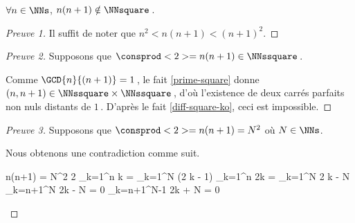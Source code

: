 \begin{fact} \label{case-2}
	 $\forall n \in \NNs$, $n(n+1) \notin \NNsquare$\,.
\end{fact}




\begin{proof}[Preuve 1]
	Il suffit de noter que $n^2 < n(n+1) < (n+1)^2$.
\end{proof}




\begin{proof}[Preuve 2]
    Supposons que $\consprod<2> = n(n+1) \in \NNssquare$\,.
    
    \smallskip
    
    Comme $\GCD{n}{(n + 1)} = 1$\,, le fait \ref{prime-square} donne $(n, n + 1) \in \NNssquare \times \NNssquare$\,, d'où l'existence de deux carrés parfaits non nuls distants de $1$\,.
    D'après le fait \ref{diff-square-ko}, ceci est impossible.
\end{proof}




\begin{proof}[Preuve 3]
	Supposons que $\consprod<2> = n(n+1) = N^2$ où $N \in \NNs$.
     
    \smallskip
    
    Nous obtenons une contradiction comme suit.
	
	\medskip
	
	\begin{stepcalc}[style = ar*, ope = \iff]
		n(n+1) = N^2
		2 \dsum_{k=1}^{n} k = \dsum_{k=1}^{N} (2 k - 1)
	\explnext{}
		\dsum_{k=1}^{n} 2k = \dsum_{k=1}^{N} 2 k - N
		\dsum_{k=n+1}^{N} 2k - N = 0
		\dsum_{k=n+1}^{N-1} 2k + N = 0
	\end{stepcalc}

	\vspace{-2ex}	
	\leavevmode
\end{proof}


